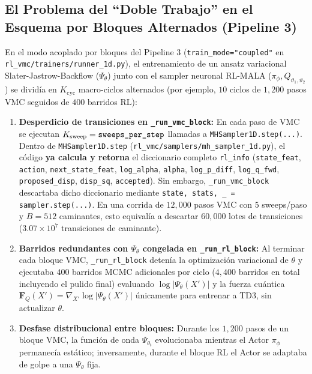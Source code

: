 \documentclass[10pt,a4paper]{article}
\begin{document}
\subsection{El Problema del ``Doble Trabajo'' en el Esquema por Bloques Alternados (Pipeline 3)}

En el modo acoplado por bloques del Pipeline 3 (\texttt{train\_mode="coupled"} en \texttt{rl\_vmc/trainers/runner\_1d.py}), el entrenamiento de un ansatz variacional Slater-Jastrow-Backflow ($\Psi_\theta$) junto con el sampler neuronal RL-MALA ($\pi_\phi, Q_{\vartheta_1, \vartheta_2}$) se divid\'ia en $K_{\mathrm{cyc}}$ macro-ciclos alternados (por ejemplo, $10$ ciclos de $1,200$ pasos VMC seguidos de $400$ barridos RL):

\begin{enumerate}
\item \textbf{Desperdicio de transiciones en \texttt{\_run\_vmc\_block}:} En cada paso de VMC se ejecutan $K_{\mathrm{sweep}} = \text{\texttt{sweeps\_per\_step}}$ llamadas a \texttt{MHSampler1D.step(...)}. Dentro de \texttt{MHSampler1D.step} (\texttt{rl\_vmc/samplers/mh\_sampler\_1d.py}), el c\'odigo \textbf{ya calcula y retorna} el diccionario completo \texttt{rl\_info} (\texttt{state\_feat}, \texttt{action}, \texttt{next\_state\_feat}, \texttt{log\_alpha}, \texttt{alpha}, \texttt{log\_p\_diff}, \texttt{log\_q\_fwd}, \texttt{proposed\_disp}, \texttt{disp\_sq}, \texttt{accepted}). Sin embargo, \texttt{\_run\_vmc\_block} descartaba dicho diccionario mediante \texttt{state, stats, \_ = sampler.step(...)}. En una corrida de $12,000$ pasos VMC con $5$ sweeps/paso y $B=512$ caminantes, esto equival\'ia a descartar $60,000$ lotes de transiciones ($3.07 \times 10^7$ transiciones de caminante).
\item \textbf{Barridos redundantes con $\Psi_\theta$ congelada en \texttt{\_run\_rl\_block}:} Al terminar cada bloque VMC, \texttt{\_run\_rl\_block} deten\'ia la optimizaci\'on variacional de $\theta$ y ejecutaba $400$ barridos MCMC adicionales por ciclo ($4,400$ barridos en total incluyendo el pulido final) evaluando $\log|\Psi_\theta(X')|$ y la fuerza cu\'antica $\bm{F}_Q(X') = \nabla_{X'}\log|\Psi_\theta(X')|$ \'unicamente para entrenar a TD3, sin actualizar $\theta$.
\item \textbf{Desfase distribucional entre bloques:} Durante los $1,200$ pasos de un bloque VMC, la funci\'on de onda $\Psi_{\theta_t}$ evolucionaba mientras el Actor $\pi_\phi$ permanec\'ia est\'atico; inversamente, durante el bloque RL el Actor se adaptaba de golpe a una $\Psi_\theta$ fija.
\end{enumerate}
\end{document}
